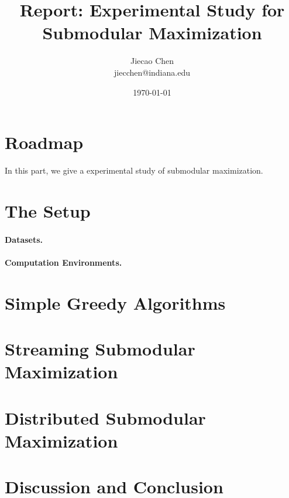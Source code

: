 \documentclass[11pt]{article}
\begin{document}
\title{Report: Experimental Study for Submodular Maximization}
\author{Jiecao Chen\\ jiecchen@indiana.edu}
\date{\today}

\maketitle



\section{Roadmap}
In this part, we give a experimental study of submodular maximization. 

\section{The Setup}
\label{sec:setup}
\paragraph{Datasets.}
\paragraph{Computation Environments.}



\section{Simple Greedy Algorithms}
\label{sec:greedy}

\section{Streaming Submodular Maximization}
\label{sec:streaming}

\section{Distributed Submodular Maximization}
\label{sec:distributed}

\section{Discussion and Conclusion}
\label{sec:conclude}




















%
\end{document}
